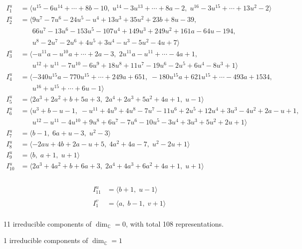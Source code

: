 \documentclass[1p]{elsarticle_modified}
\theoremstyle{definition}
\begin{document}
\begin{align*}
I^u_{1}&=\langle 
u^{15}-6 u^{14}+\cdots+8 b-10,\;u^{14}-3 u^{13}+\cdots+8 a-2,\;u^{16}-3 u^{15}+\cdots+13 u^2-2\rangle \\
I^u_{2}&=\langle 
9 u^7-7 u^6-24 u^5- u^4+13 u^3+35 u^2+23 b+8 u-39,\\
\phantom{I^u_{2}}&\phantom{= \langle  }66 u^7-13 u^6-153 u^5-107 u^4+149 u^3+249 u^2+161 a-64 u-194,\\
\phantom{I^u_{2}}&\phantom{= \langle  }u^8-2 u^7-2 u^6+4 u^5+3 u^4- u^3-5 u^2-4 u+7\rangle \\
I^u_{3}&=\langle 
- u^{11} a- u^{10} a+\cdots+2 a-3,\;2 u^{11} a- u^{11}+\cdots-4 a+1,\\
\phantom{I^u_{3}}&\phantom{= \langle  }u^{12}+u^{11}-7 u^{10}-6 u^9+18 u^8+11 u^7-19 u^6-2 u^5+6 u^4-8 u^3+1\rangle \\
I^u_{4}&=\langle 
-340 u^{15} a-770 u^{15}+\cdots+249 a+651,\;-180 u^{15} a+621 u^{15}+\cdots-493 a+1534,\\
\phantom{I^u_{4}}&\phantom{= \langle  }u^{16}+u^{15}+\cdots+6 u-1\rangle \\
I^u_{5}&=\langle 
2 a^3+2 a^2+b+5 a+3,\;2 a^4+2 a^3+5 a^2+4 a+1,\;u-1\rangle \\
I^u_{6}&=\langle 
u^3+b- u-1,\;- u^{11}+4 u^9+4 u^8-7 u^7-11 u^6+2 u^5+12 u^4+3 u^3-4 u^2+2 a- u+1,\\
\phantom{I^u_{6}}&\phantom{= \langle  }u^{12}- u^{11}-4 u^{10}+9 u^8+6 u^7-7 u^6-10 u^5-3 u^4+3 u^3+5 u^2+2 u+1\rangle \\
I^u_{7}&=\langle 
b-1,\;6 a+u-3,\;u^2-3\rangle \\
I^u_{8}&=\langle 
-2 a u+4 b+2 a- u+5,\;4 a^2+4 a-7,\;u^2-2 u+1\rangle \\
I^u_{9}&=\langle 
b,\;a+1,\;u+1\rangle \\
I^u_{10}&=\langle 
2 a^3+4 a^2+b+6 a+3,\;2 a^4+4 a^3+6 a^2+4 a+1,\;u+1\rangle \\
\end{align*}\\
\begin{align*}
I^u_{11}&=\langle 
b+1,\;u-1\rangle \\
\\
I^v_{1}&=\langle 
a,\;b-1,\;v+1\rangle \\
\end{align*}
\raggedright * 11 irreducible components of $\dim_{\mathbb{C}}=0$, with total 108 representations.\\
\raggedright * 1 irreducible components of $\dim_{\mathbb{C}}=1$ \\
\end{document}
